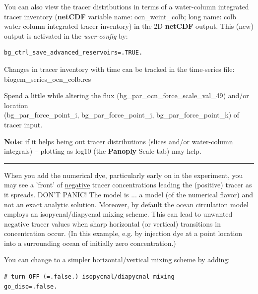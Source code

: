 \vspace{1mm}
You can also view the tracer distributions in terms of a water-column integrated tracer inventory (\textbf{netCDF} variable name: \textsf{\footnotesize ocn\_wcint\_colb}; long name: \textsf{\footnotesize colb water-column integrated tracer inventory}) in the 2D \textbf{netCDF} output. This (new) output is activated in the \textit{user-config} by:
\vspace{-2mm}\small\begin{verbatim}
bg_ctrl_save_advanced_reservoirs=.TRUE.
\end{verbatim}\normalsize\vspace{-2mm}
Changes in tracer inventory with time can be tracked in the time-series file: \textsf{\footnotesize biogem\_series\_ocn\_colb.res}

Spend a little while altering the flux (\textsf{\footnotesize bg\_par\_ocn\_force\_scale\_val\_49}) and/or location
\\(\textsf{\footnotesize bg\_par\_force\_point\_i, bg\_par\_force\_point\_j, bg\_par\_force\_point\_k}) of tracer input.

\noindent \textbf{Note}: if it helps being out tracer distributions (slices and/or water-column integrals) -- plotting as log10 (the \textbf{Panoply} \textsf{\footnotesize Scale} tab) may help.

\vspace{1mm}\noindent\rule{4cm}{0.5pt}\vspace{2mm}

\noindent When you add the numerical dye, particularly early on in the experiment, you may see a 'front' of \uline{negative} tracer concentrations leading the (positive) tracer as it spreads. DON'T PANIC! The model is ... a model (of the numerical flavor) and not an exact analytic solution. Moreover, by default the ocean circulation model employs an isopycnal/diapycnal mixing scheme. This can lead to unwanted negative tracer values when sharp horizontal (or vertical) transitions in concentration occur. (In this example, e.g. by injection dye at a point location into a surrounding ocean of initially zero concentration.)

You can change to a simpler horizontal/vertical mixing scheme by adding:

\vspace{-2mm}\small\begin{verbatim}
# turn OFF (=.false.) isopycnal/diapycnal mixing
go_diso=.false.
\end{verbatim}\normalsize\vspace{-2mm}

